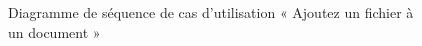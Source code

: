 \begin{figure}[H]
  \centering
  \caption{Diagramme de séquence de cas d'utilisation « Ajoutez un fichier à un document  »}
  \label{fig:sequence_add_file}
\end{figure}
